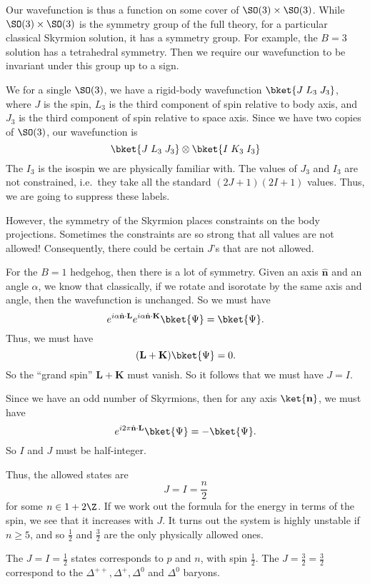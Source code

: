\documentclass[a4paper]{article}
\begin{document}
Our wavefunction is thus a function on some cover of $\SO(3) \times \SO(3)$. While $\SO(3) \times \SO(3)$ is the symmetry group of the full theory, for a particular classical Skyrmion solution, it has a symmetry group. For example, the $B = 3$ solution has a tetrahedral symmetry. Then we require our wavefunction to be invariant under this group up to a sign.

We for a single $\SO(3)$, we have a rigid-body wavefunction $\bket{J\; L_3\; J_3}$, where $J$ is the spin, $L_3$ is the third component of spin relative to body axis, and $J_3$ is the third component of spin relative to space axis. Since we have two copies of $\SO(3)$, our wavefunction is
\[
  \bket{J\; L_3\; J_3} \otimes \bket{I\; K_3\; I_3}
\]
The $I_3$ is the isospin we are physically familiar with. The values of $J_3$ and $I_3$ are not constrained, i.e.\ they take all the standard $(2J + 1)(2I + 1)$ values. Thus, we are going to suppress these labels.

However, the symmetry of the Skyrmion places constraints on the body projections. Sometimes the constraints are so strong that all values are not allowed! Consequently, there could be certain $J$'s that are not allowed.

\begin{eg}
  For the $B = 1$ hedgehog, then there is a lot of symmetry. Given an axis $\hat{\mathbf{n}}$ and an angle $\alpha$, we know that classically, if we rotate and isorotate by the same axis and angle, then the wavefunction is unchanged. So we must have
  \[
    e^{i \alpha \hat{\mathbf{n}} \cdot \mathbf{L}} e^{i \alpha \hat{\mathbf{n}} \cdot \mathbf{K}} \bket{\Psi} = \bket{\Psi}.
  \]
  Thus, we must have
  \[
    (\mathbf{L} + \mathbf{K}) \bket{\Psi} = 0.
  \]
  So the ``grand spin'' $\mathbf{L} + \mathbf{K}$ must vanish. So it follows that we must have $J = I$.

  Since we have an odd number of Skyrmions, then for any axis $\ket{\mathbf{n}}$, we must have
  \[
    e^{i 2\pi \hat{\mathbf{n}} \cdot \mathbf{L}} \bket{\Psi} = - \bket{\Psi}.
  \]
  So $I$ and $J$ must be half-integer.

  Thus, the allowed states are
  \[
    J = I = \frac{n}{2}
  \]
  for some $n \in 1 + 2\Z$. If we work out the formula for the energy in terms of the spin, we see that it increases with $J$. It turns out the system is highly unstable if $n \geq 5$, and so $\frac{1}{2}$ and $\frac{3}{2}$ are the only physically allowed ones.

  The $J = I = \frac{1}{2}$ states corresponds to $p$ and $n$, with spin $\frac{1}{2}$. The $J = \frac{3}{2} = \frac{3}{2}$ correspond to the $\Delta^{++}, \Delta^+, \Delta^0$ and $\Delta^0$ baryons.
\end{eg}
\end{document}
